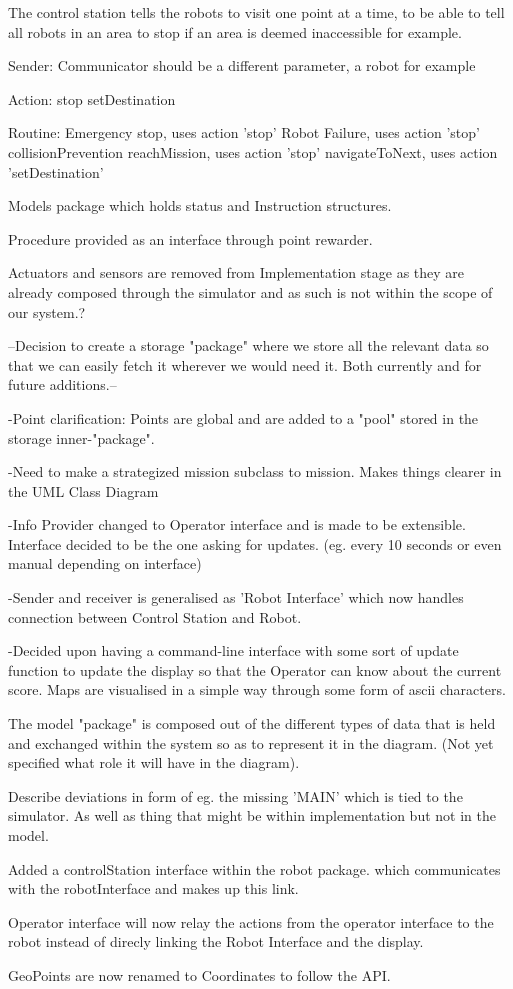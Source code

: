 The control station tells the robots to visit one point at a time, to be able to tell all robots in an area to stop if an area is deemed inaccessible for example.

Sender: Communicator should be a different parameter, a robot for example

Action:
stop
setDestination

Routine:
Emergency stop, uses action 'stop'
Robot Failure, uses action 'stop'
collisionPrevention
reachMission, uses action 'stop'
navigateToNext, uses action 'setDestination'

Models package which holds status and Instruction structures.

Procedure provided as an interface through point rewarder.

Actuators and sensors are removed from Implementation stage as they are already composed through the simulator and as such is not within the scope of our system.?

--Decision to create a storage "package" where we store all the relevant data so that we can easily fetch it wherever we would need it. Both currently and for future additions.--

-Point clarification:
  Points are global and are added to a "pool" stored in the storage inner-"package".
 
-Need to make a strategized mission subclass to mission. Makes things clearer in the UML Class Diagram

-Info Provider changed to Operator interface and is made to be extensible. Interface decided to be the one asking for updates. (eg. every 10 seconds or even manual depending on interface)

-Sender and receiver is generalised as 'Robot Interface' which now handles connection between Control Station and Robot.

-Decided upon having a command-line interface with some sort of update function to update the display so that the Operator can know about the current score. Maps are visualised in a simple way through some form of ascii characters.

The model "package" is composed out of the different types of data that is held and exchanged within the system so as to represent it in the diagram. (Not yet specified what role it will have in the diagram).

Describe deviations in form of eg. the missing 'MAIN' which is tied to the simulator. As well as thing that might be within implementation but not in the model.

Added a controlStation interface within the robot package. which communicates with the robotInterface and makes up this link.

Operator interface will now relay the actions from the operator interface to the robot instead of direcly linking the Robot Interface and the display.

GeoPoints are now renamed to Coordinates to follow the API.

